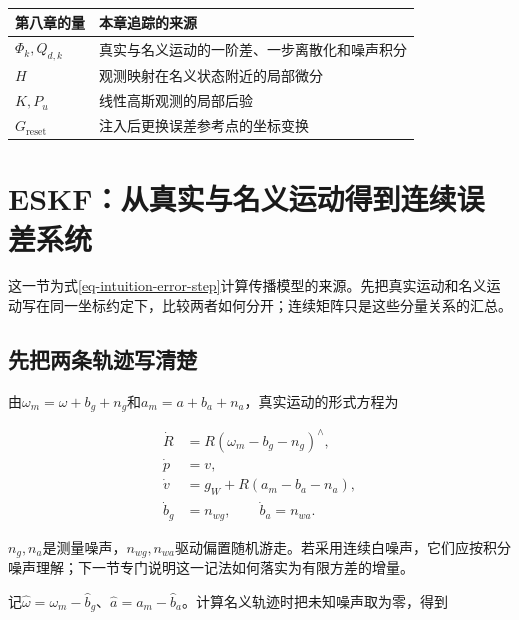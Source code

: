 \begin{center}\small\begin{tabular}{p{}p{}}\toprule

第八章的量 & 本章追踪的来源 \\

\midrule

$\Phi_k,Q_{d,k}$ & 真实与名义运动的一阶差、一步离散化和噪声积分 \\

$H$ & 观测映射在名义状态附近的局部微分 \\

$K,P_u$ & 线性高斯观测的局部后验 \\

$G_{\mathrm{reset}}$ & 注入后更换误差参考点的坐标变换 \\

\bottomrule\end{tabular}\end{center}

\section{ESKF：从真实与名义运动得到连续误差系统}

这一节为式\eqref{eq-intuition-error-step}计算传播模型的来源。先把真实运动和名义运动写在同一坐标约定下，比较两者如何分开；连续矩阵只是这些分量关系的汇总。

\subsection{先把两条轨迹写清楚}

由$\omega_m=\omega+b_g+n_g$和$a_m=a+b_a+n_a$，真实运动的形式方程为

\begin{equation}\label{eq-eskf-true-dynamics}
\begin{aligned}
 \dot R&=R(\omega_m-b_g-n_g)^\wedge,\\
 \dot p&=v,\\
 \dot v&=g_W+R(a_m-b_a-n_a),\\
 \dot b_g&=n_{wg},\qquad\dot b_a=n_{wa}.
\end{aligned}
\end{equation}

$n_g,n_a$是测量噪声，$n_{wg},n_{wa}$驱动偏置随机游走。若采用连续白噪声，它们应按积分噪声理解；下一节专门说明这一记法如何落实为有限方差的增量。

记$\hat\omega=\omega_m-\hat b_g$、$\hat a=a_m-\hat b_a$。计算名义轨迹时把未知噪声取为零，得到


